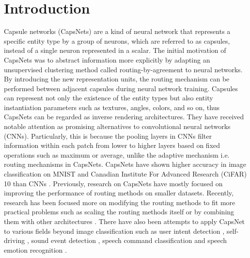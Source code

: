 \documentclass[review]{elsarticle}
\begin{document}
\linenumbers

\section{Introduction}
Capsule networks (CapsNets) \citep{DBLP:conf/icann/HintonKW11, DBLP:conf/nips/SabourFH17, DBLP:conf/iclr/HintonSF18} are a kind of neural network that represents a specific entity type by a group of neurons, which are referred to as capsules, instead of a single neuron represented in a scalar.
The initial motivation of CapsNets was to abstract information more explicitly by adapting an unsupervised clustering method called routing-by-agreement to neural networks.
By introducing the new representation units, the routing mechanism can be performed between adjacent capsules during neural network training.
Capsules can represent not only the existence of the entity types but also entity instantiation parameters such as textures, angles, colors, and so on, thus CapsNets can be regarded as inverse rendering architectures.
They have received notable attention as promising alternatives to convolutional neural networks (CNNs).
Particularly, this is because the pooling layers in CNNs filter information within each patch from lower to higher layers based on fixed operations such as maximum or average, unlike the adaptive mechanism i.e. routing mechanisms in CapsNets.
CapsNets have shown higher accuracy in image classification on MNIST \citep{lecun-mnisthandwrittendigit-2010} and Canadian Institute For Advanced Research (CiFAR) 10 \citep{Krizhevsky09learningmultiple} than CNNs \citep{DBLP:conf/nips/HahnPK19, Malmgren1314210}.
Previously, research on CapsNets have mostly focused on improving the performance of routing methods \citep{Malmgren1314210, DBLP:conf/iclr/Wang018} on smaller datasets.
Recently, research has been focused more on modifying the routing methods to fit more practical problems such as scaling the routing methods itself \citep{DBLP:conf/iclr/TsaiSGS20} or by combining them with other architectures \citep{DBLP:conf/icann/HePLHZ19, 8852016, wang-2019-towards}.
There have also been attempts to apply CapsNet to various fields beyond image classification such as user intent detection \citep{DBLP:conf/emnlp/XiaZYCY18, DBLP:conf/acl/ZhangLDFY19}, self-driving \citep{DBLP:journals/tjs/KimC19},
sound event detection \citep{DBLP:conf/eusipco/Iqbal0KW18}, speech command classification \citep{DBLP:conf/interspeech/BaeK18} and speech emotion recognition \citep{DBLP:conf/icassp/WuLCLYDMHWLM19}.
\end{document}

